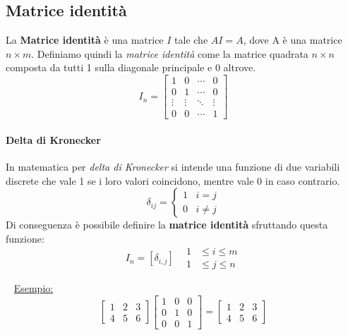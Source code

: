 \documentclass[12pt,oneside]{book}
\begin{document}
\subsection{Matrice identità}
La \textbf{Matrice identità} è una matrice $I$ tale che $AI = A$, dove A è una matrice $n \times m$.
Definiamo quindi la \emph{matrice identità} come la matrice quadrata $n \times n$ composta da tutti 1 sulla diagonale principale
e 0 altrove.
\begin{equation*}
    I_n =
    \begin{bmatrix}
        1      & 0      & \cdots & 0      \\
        0      & 1      & \cdots & 0      \\
        \vdots & \vdots & \ddots & \vdots \\
        0      & 0      & \cdots & 1
    \end{bmatrix}
\end{equation*}

\paragraph{Delta di Kronecker}
In matematica per \emph{delta di Kronecker} si intende una funzione di due variabili discrete
che vale 1 se i loro valori coincidono, mentre vale 0 in caso contrario.
\begin{equation*}
    \delta_{ij} =
    \begin{cases}
        1 \;\;\; i=j \\
        0 \;\;\; i \neq j
    \end{cases}
\end{equation*}
Di conseguenza è possibile definire la \textbf{matrice identità} sfruttando questa funzione:
\begin{equation*}
    I_n = [\delta_{i,j}] \;\;\; \scriptstyle \begin{aligned} 1&\le i\le m\\ 1&\le j\le n \end{aligned}
\end{equation*}

~\newline
\underline{Esempio:}
\begin{equation*}
    \begin{bmatrix}
        1 & 2 & 3 \\
        4 & 5 & 6
    \end{bmatrix}
    \begin{bmatrix}
        1 & 0 & 0 \\
        0 & 1 & 0 \\
        0 & 0 & 1
    \end{bmatrix} = 
    \begin{bmatrix}
        1 & 2 & 3 \\
        4 & 5 & 6
    \end{bmatrix}
\end{equation*}
\end{document}
